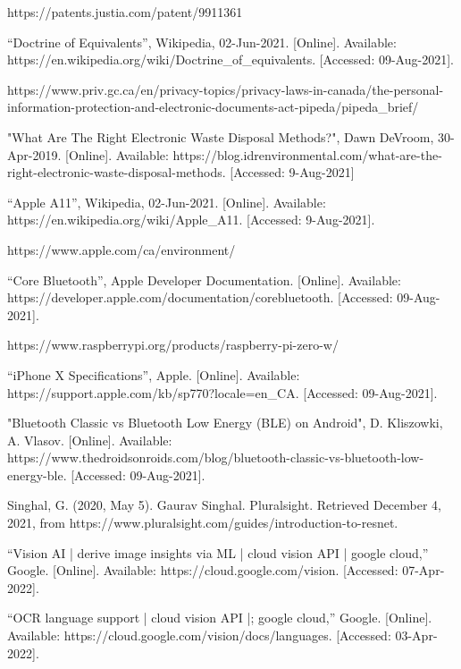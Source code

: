 \documentclass[a4paper,11pt]{article}
\begin{document}
\begin{thebibliography}{9}
https://patents.justia.com/patent/9911361

“Doctrine of Equivalents”, Wikipedia, 02-Jun-2021. [Online]. Available: https://en.wikipedia.org/wiki/Doctrine\_of\_equivalents. [Accessed: 09-Aug-2021].

https://www.priv.gc.ca/en/privacy-topics/privacy-laws-in-canada/the-personal-information-protection-and-electronic-documents-act-pipeda/pipeda\_brief/

"What Are The Right Electronic Waste Disposal Methods?", Dawn DeVroom, 30-Apr-2019. [Online]. Available: https://blog.idrenvironmental.com/what-are-the-right-electronic-waste-disposal-methods. [Accessed: 9-Aug-2021]

“Apple A11”, Wikipedia, 02-Jun-2021. [Online]. Available:
https://en.wikipedia.org/wiki/Apple\_A11. [Accessed: 9-Aug-2021].

https://www.apple.com/ca/environment/

“Core Bluetooth”, Apple Developer Documentation. [Online]. Available: https://developer.apple.com/documentation/corebluetooth. [Accessed: 09-Aug-2021]. 

https://www.raspberrypi.org/products/raspberry-pi-zero-w/

“iPhone X Specifications”, Apple. [Online]. Available: https://support.apple.com/kb/sp770?locale=en\_CA. [Accessed: 09-Aug-2021]. 

"Bluetooth Classic vs Bluetooth Low Energy (BLE) on Android", D. Kliszowki, A. Vlasov. [Online]. Available: https://www.thedroidsonroids.com/blog/bluetooth-classic-vs-bluetooth-low-energy-ble. [Accessed: 09-Aug-2021].

Singhal, G. (2020, May 5). Gaurav Singhal. Pluralsight. Retrieved December 4, 2021, from https://www.pluralsight.com/guides/introduction-to-resnet.

“Vision AI | derive image insights via ML | cloud vision API | google cloud,” Google. [Online]. Available: https://cloud.google.com/vision. [Accessed: 07-Apr-2022]. 

“OCR language support | cloud vision API |; google cloud,” Google. [Online]. Available: https://cloud.google.com/vision/docs/languages. [Accessed: 03-Apr-2022]. 


\end{thebibliography}
\end{document}
